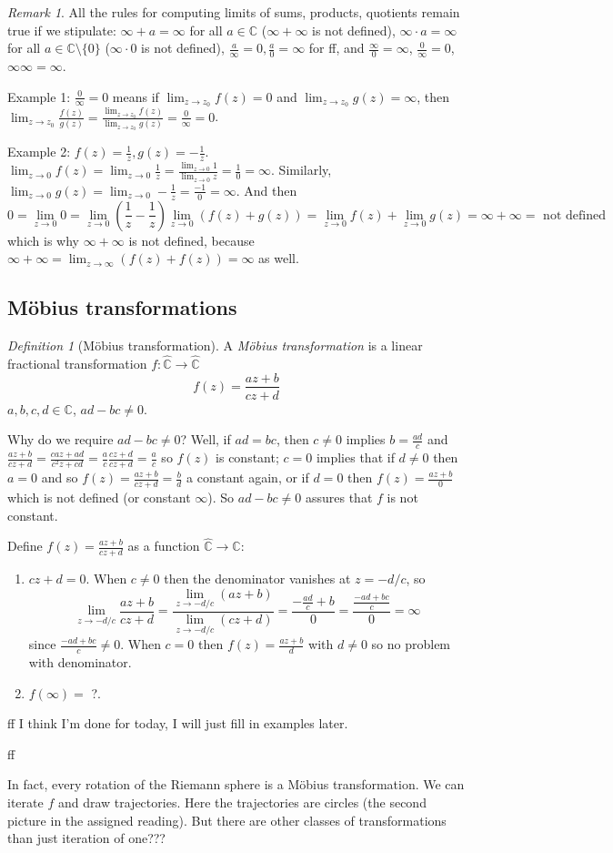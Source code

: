 \documentclass{article}
\theoremstyle{plain}
\theoremstyle{remark}
\newtheorem{definition}{Definition}
\newtheorem{remark}{Remark}
\newcommand{\C}{{\mathbb C}}
\begin{document}
\begin{remark}
	All the rules for computing limits of sums, products, quotients remain true
	if we stipulate:
	$\infty + a = \infty$ for all $a \in \C$ ($\infty+\infty$ is not defined),
	$\infty \cdot a = \infty$ for all $a \in \C\setminus\{0\}$
	($\infty\cdot0$ is not defined),
	$\frac{a}{\infty} = 0, \frac{a}{0} = \infty$ for ff,
	and $\frac{\infty}{0} = \infty$, $\frac{0}{\infty}=0$, $\infty\infty = \infty$.
\end{remark}

Example 1: $\frac{0}{\infty} = 0$ means if $\lim_{z \to z_0}f(z) = 0$ and
$\lim_{z\to z_0}g(z) = \infty$,
then $\lim_{z\to z_0}\frac{f(z)}{g(z)} =
\frac{\lim_{z\to z_0}f(z)}{\lim_{z\to z_0}g(z)} = \frac{0}{\infty} = 0$.

Example 2: $f(z) = \frac{1}{z}, g(z) = -\frac{1}{z}$.
$\lim_{z \to 0} f(z) = \lim_{z \to 0} \frac{1}{z}
= \frac{\lim_{z \to 0} 1}{\lim_{z \to 0} z} = \frac{1}{0} = \infty$.
Similarly, $\lim_{z \to 0} g(z) = \lim_{z \to 0} -\frac{1}{z}
= \frac{-1}{0} = \infty$.
And then
\[
	0 = \lim_{z \to 0}0 = \lim_{z \to 0}\left(\frac{1}{z}-\frac{1}{z}\right)
	\lim_{z\to0}\left(f(z) + g(z)\right) =
	\lim_{z \to 0}f(z) + \lim_{z \to 0}g(z) = \infty + \infty = \text{ not defined}
\]
which is why $\infty + \infty$ is not defined,
because $\infty + \infty = \lim_{z\to\infty}\left(f(z) + f(z)\right) = \infty$ as well.

\subsection{M\"{o}bius transformations}
\begin{definition}[M\"{o}bius transformation]
	A \emph{M\"{o}bius transformation} is a linear fractional transformation
	$f \colon \hat{\C} \to \hat{\C}$
	\[
		f(z) = \frac{az + b}{cz + d}
	\]
	$a,b,c,d \in \C$, $ad - bc \neq 0$.
\end{definition}
Why do we require $ad - bc \neq 0$?
Well, if $ad = bc$, then
$c \neq 0$ implies $b = \frac{ad}{c}$ and
$\frac{az+b}{cz+d} = \frac{caz + ad}{c^2z+cd} = \frac{a}{c}\frac{cz+d}{cz+d} = \frac{a}{c}$
so $f(z)$ is constant;
$c = 0$ implies that if $d \neq 0$ then $a = 0$ and so
$f(z) = \frac{az+b}{cz+d} = \frac{b}{d}$ a constant again,
or if $d = 0$ then $f(z) = \frac{az+b}{0}$ which is not defined (or constant $\infty$).
So $ad - bc \neq 0$ assures that $f$ is not constant.

Define $f(z) = \frac{az+b}{cz+d}$ as a function $\hat{\C} \to \hat{\C}$:
\begin{enumerate}
	\item $cz + d = 0$.
		When $c \neq 0$ then the denominator vanishes at $z = -d/c$,
		so
		\[
			\lim_{z \to -d/c} \frac{az+b}{cz+d}
			= \frac{\displaystyle\lim_{z\to-d/c}(az+b)}{\displaystyle\lim_{z\to-d/c}(cz+d)}
			= \frac{-\frac{ad}{c}+b}{0}
			= \frac{\frac{-ad+bc}{c}}{0} = \infty
		\]
		since $\frac{-ad+bc}{c} \neq 0$.
		When $c = 0$ then $f(z) = \frac{az+b}{d}$ with $d\neq0$ so no problem with denominator.
	\item $f(\infty) =$ ?.
\end{enumerate}
ff I think I'm done for today, I will just fill in examples later.

ff

In fact, every rotation of the Riemann sphere is a M\"{o}bius transformation.
We can iterate $f$ and draw trajectories.
Here the trajectories are circles (the second picture in the assigned reading).
But there are other classes of transformations than just iteration of one???
\end{document}
